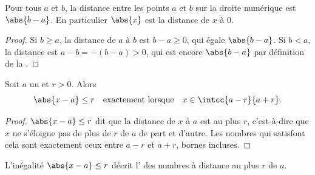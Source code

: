 \begin{proposition}\label{prop:g10:numbers:distance}
Pour tous  $a$ et $b$, la distance entre les points $a$
et $b$ sur la droite numérique est $\abs{b - a}$. En particulier
$\abs{x}$ est la distance de $x$ à $0$.
\end{proposition}

\begin{proof}
Si $b \geq a$, la distance de $a$ à $b$ est $b - a \geq 0$, qui égale
$\abs{b-a}$. Si $b < a$, la distance est $a - b = -(b - a) > 0$, qui
est encore $\abs{b - a}$ par définition de la .
\end{proof}

\begin{proposition}\label{prop:g10:numbers:absinterval}
Soit $a$ un  et $r > 0$. Alors
\[
\abs{x - a} \leq r
\quad\text{exactement lorsque}\quad
x \in \intcc{a - r}{a + r}.
\]
\end{proposition}

\begin{proof}
$\abs{x-a} \leq r$ dit que la distance de $x$ à $a$ est au plus $r$,
c'est-à-dire que $x$ ne s'éloigne pas de plus de $r$ de $a$ de part et
d'autre. Les nombres qui satisfont cela sont exactement ceux entre
$a - r$ et $a + r$, bornes incluses.
\end{proof}

\begin{omfigure}

{\small L'inégalité $\abs{x - a} \leq r$ décrit l' des
nombres à distance au plus $r$ de $a$.}
\end{omfigure}

